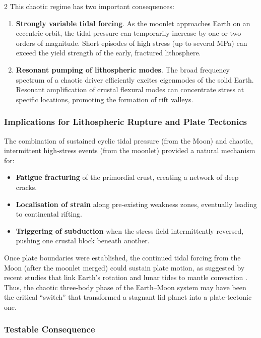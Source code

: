 \documentclass[11pt,a4paper]{article}
\begin{document}
\begin{multicols}{2}
		This chaotic regime has two important consequences:
		
		\begin{enumerate}
			\item \textbf{Strongly variable tidal forcing}.  As the moonlet approaches Earth on an eccentric orbit, the tidal pressure can temporarily increase by one or two orders of magnitude.  Short episodes of high stress (up to several MPa) can exceed the yield strength of the early, fractured lithosphere.
			\item \textbf{Resonant pumping of lithospheric modes}.  The broad frequency spectrum of a chaotic driver efficiently excites eigenmodes of the solid Earth.  Resonant amplification of crustal flexural modes can concentrate stress at specific locations, promoting the formation of rift valleys.
		\end{enumerate}
		
		\subsubsection{Implications for Lithospheric Rupture and Plate Tectonics}
		
		The combination of sustained cyclic tidal pressure (from the Moon) and chaotic, intermittent high‑stress events (from the moonlet) provided a natural mechanism for:
		
		\begin{itemize}
			\item \textbf{Fatigue fracturing} of the primordial crust, creating a network of deep cracks.
			\item \textbf{Localisation of strain} along pre‑existing weakness zones, eventually leading to continental rifting.
			\item \textbf{Triggering of subduction} when the stress field intermittently reversed, pushing one crustal block beneath another.
		\end{itemize}
		
		Once plate boundaries were established, the continued tidal forcing from the Moon (after the moonlet merged) could sustain plate motion, as suggested by recent studies that link Earth’s rotation and lunar tides to mantle convection \cite{Rampino2021}.  Thus, the chaotic three‑body phase of the Earth–Moon system may have been the critical “switch” that transformed a stagnant lid planet into a plate‑tectonic one.
		
		\subsubsection{Testable Consequence}
		

\end{multicols}
\end{document}
